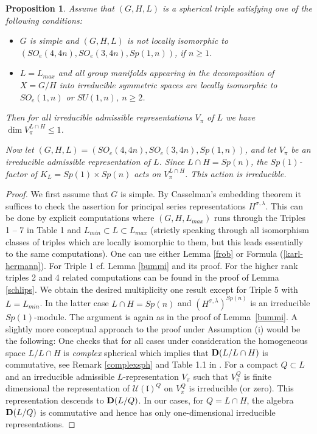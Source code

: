 \documentclass[10]{amsart}
\newtheorem{pro}[thm]{Proposition}
\theoremstyle{remark}
\theoremstyle{definition}
\numberwithin{equation}{section}
\newcommand{\fl}{{\mathfrak l}}
\newcommand{\Cal}{\mathcal}
\begin{document}
{\begin{pro}\label{mufree}
Assume that $(G,H,L)$ is a spherical triple satisfying one of the following conditions:
\begin{itemize}
\item[(i)] $G$ is simple and $(G,H,L)$ is not locally isomorphic to $(SO_e(4,4n), SO_e(3,4n), Sp(1,n))$, if $n\geq 1$.
\item[(ii)] $L=L_{max}$ and all group manifolds appearing in the decomposition of $X=G/H$ into irreducible symmetric spaces are locally isomorphic to $SO_e(1,n)$ or $SU(1,n)$, $n\geq 2$.
\end{itemize} 
Then for all irreducible admissible representations $V_\pi$ of $L$ we have $\dim V_\pi^{L\cap H}\le 1$.

Now let $(G,H,L)=(SO_e(4,4n), SO_e(3,4n), Sp(1,n))$, and let $V_\pi$ be an irreducible admissible representation of $L$. Since $L\cap H=Sp(n)$, the $Sp(1)$-factor
of $K_L=Sp(1)\times Sp(n)$ acts on $V_\pi^{L\cap H}$. This action is irreducible.
\end{pro}

\begin{proof} We first assume that $G$ is simple. By Casselman's embedding theorem it suffices to check the assertion for principal series representations $H^{\sigma,\lambda}$.
This can be done by explicit computations where $(G,H,L_{max})$ runs through the Triples 1 -- 7 in Table 1 and $L_{min}\subset L\subset L_{max}$ (strictly speaking through all
isomorphism classes of triples which are locally isomorphic to them, but this leads essentially to the same computations).  One can use
either Lemma \ref{frob} or Formula (\ref{karl-hermann}). For Triple 1 cf. Lemma \ref{bummi} and its proof. For the higher rank triples 2 and 4 related computations can be found in the proof of Lemma \ref{schlips}. We obtain the desired multiplicity one result except for Triple 5 with $L=L_{min}$. In the latter case $L\cap H=Sp(n)$ and $(H^{\sigma,\lambda})^{Sp(n)}$
is an irreducible $Sp(1)$-module. The argument is again as in the proof of Lemma~\ref{bummi}. A slightly more conceptual approach to the proof under Assumption (i) would be the following: One checks that for all cases under consideration the homogeneous
space $L/L\cap H$ is {\em complex} spherical which implies that ${\bf D}(L/L\cap H)$ is commutative, see Remark \ref{complexsph} and  Table 1.1 in \cite{KK19}.
For a compact $Q\subset L$ and an irreducible admissible $L$-representation $V_\pi$ such that  $V_\pi^Q$ is finite dimensional the representation of ${\Cal U}(\fl)^Q$ on $V_\pi^Q$ is irreducible (or zero).
This representation descends to ${\bf D}(L/Q)$. In our cases, for $Q=L\cap H$, the algebra ${\bf D}(L/Q)$ is commutative and hence has only one-dimensional irreducible representations. 


\end{proof}}
\end{document}
